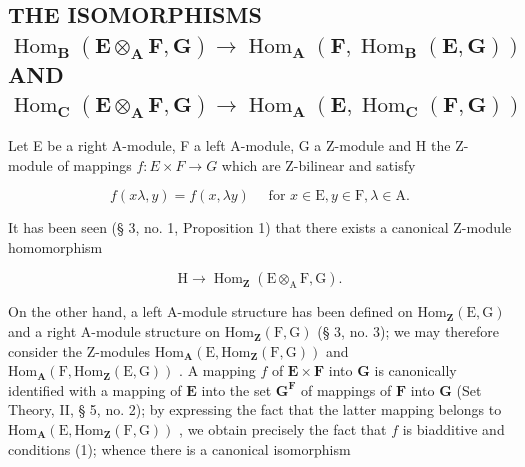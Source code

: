\subsection{\texorpdfstring{THE ISOMORPHISMS \(\operatorname{Hom}_{\mathbf{B}}(\mathbf{E} \otimes_{\mathbf{A}} \mathbf{F}, \mathbf{G}) \to \operatorname{Hom}_{\mathbf{A}}(\mathbf{F}, \operatorname{Hom}_{\mathbf{B}}(\mathbf{E}, \mathbf{G}))\) AND \(\operatorname{Hom}_{\mathbf{C}}(\mathbf{E} \otimes_{\mathbf{A}} \mathbf{F}, \mathbf{G}) \to \operatorname{Hom}_{\mathbf{A}}(\mathbf{E}, \operatorname{Hom}_{\mathbf{C}}(\mathbf{F}, \mathbf{G}))\)}{THE ISOMORPHISMS \textbackslash operatorname\{Hom\}\_\{\textbackslash mathbf\{B\}\}(\textbackslash mathbf\{E\} \textbackslash otimes\_\{\textbackslash mathbf\{A\}\} \textbackslash mathbf\{F\}, \textbackslash mathbf\{G\}) \textbackslash to \textbackslash operatorname\{Hom\}\_\{\textbackslash mathbf\{A\}\}(\textbackslash mathbf\{F\}, \textbackslash operatorname\{Hom\}\_\{\textbackslash mathbf\{B\}\}(\textbackslash mathbf\{E\}, \textbackslash mathbf\{G\})) AND \textbackslash operatorname\{Hom\}\_\{\textbackslash mathbf\{C\}\}(\textbackslash mathbf\{E\} \textbackslash otimes\_\{\textbackslash mathbf\{A\}\} \textbackslash mathbf\{F\}, \textbackslash mathbf\{G\}) \textbackslash to \textbackslash operatorname\{Hom\}\_\{\textbackslash mathbf\{A\}\}(\textbackslash mathbf\{E\}, \textbackslash operatorname\{Hom\}\_\{\textbackslash mathbf\{C\}\}(\textbackslash mathbf\{F\}, \textbackslash mathbf\{G\}))}}

Let E be a right A-module, F a left A-module, G a Z-module and H the Z-module of mappings \(f: E \times F \rightarrow G\) which are Z-bilinear and satisfy

\[
f (x \lambda , y) = f (x, \lambda y) \quad \text { for } x \in \mathrm{E}, y \in \mathrm{F}, \lambda \in \mathrm{A}.\tag{1}
\]

It has been seen (§ 3, no. 1, Proposition 1) that there exists a canonical Z-module homomorphism

\[
\mathrm{H} \rightarrow \operatorname{Hom} _ {\mathbf {Z}} (\mathrm{E} \otimes_ {\mathrm{A}} \mathrm{F}, \mathrm{G}).\tag{2}
\]

On the other hand, a left A-module structure has been defined on \(\mathrm{Hom}_{\mathbf{Z}}(\mathrm{E},\mathrm{G})\) and a right A-module structure on \(\mathrm{Hom}_{\mathbf{Z}}(\mathrm{F},\mathrm{G})\) (§ 3, no. 3); we may therefore consider the Z-modules \(\mathrm{Hom}_{\mathbf{A}}(\mathrm{E},\mathrm{Hom}_{\mathbf{Z}}(\mathrm{F},\mathrm{G}))\) and \(\mathrm{Hom}_{\mathbf{A}}(\mathrm{F},\mathrm{Hom}_{\mathbf{Z}}(\mathrm{E},\mathrm{G}))\) . A mapping \(f\) of \(\mathbf{E} \times \mathbf{F}\) into \(\mathbf{G}\) is canonically identified with a mapping of \(\mathbf{E}\) into the set \(\mathbf{G}^{\mathbf{F}}\) of mappings of \(\mathbf{F}\) into \(\mathbf{G}\) (Set Theory, II, § 5, no. 2); by expressing the fact that the latter mapping belongs to \(\mathrm{Hom}_{\mathbf{A}}(\mathrm{E},\mathrm{Hom}_{\mathbf{Z}}(\mathrm{F},\mathrm{G}))\) , we obtain precisely the fact that \(f\) is biadditive and conditions (1); whence there is a canonical isomorphism

